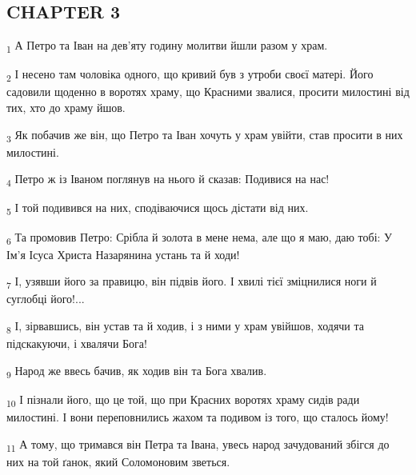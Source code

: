\subsection{CHAPTER 3}
\begin{tcolorbox}
\textsubscript{1} А Петро та Іван на дев'яту годину молитви йшли разом у храм.
\end{tcolorbox}
\begin{tcolorbox}
\textsubscript{2} І несено там чоловіка одного, що кривий був з утроби своєї матері. Його садовили щоденно в воротях храму, що Красними звалися, просити милостині від тих, хто до храму йшов.
\end{tcolorbox}
\begin{tcolorbox}
\textsubscript{3} Як побачив же він, що Петро та Іван хочуть у храм увійти, став просити в них милостині.
\end{tcolorbox}
\begin{tcolorbox}
\textsubscript{4} Петро ж із Іваном поглянув на нього й сказав: Подивися на нас!
\end{tcolorbox}
\begin{tcolorbox}
\textsubscript{5} І той подивився на них, сподіваючися щось дістати від них.
\end{tcolorbox}
\begin{tcolorbox}
\textsubscript{6} Та промовив Петро: Срібла й золота в мене нема, але що я маю, даю тобі: У Ім'я Ісуса Христа Назарянина устань та й ходи!
\end{tcolorbox}
\begin{tcolorbox}
\textsubscript{7} І, узявши його за правицю, він підвів його. І хвилі тієї зміцнилися ноги й суглобці його!...
\end{tcolorbox}
\begin{tcolorbox}
\textsubscript{8} І, зірвавшись, він устав та й ходив, і з ними у храм увійшов, ходячи та підскакуючи, і хвалячи Бога!
\end{tcolorbox}
\begin{tcolorbox}
\textsubscript{9} Народ же ввесь бачив, як ходив він та Бога хвалив.
\end{tcolorbox}
\begin{tcolorbox}
\textsubscript{10} І пізнали його, що це той, що при Красних воротях храму сидів ради милостині. І вони переповнились жахом та подивом із того, що сталось йому!
\end{tcolorbox}
\begin{tcolorbox}
\textsubscript{11} А тому, що тримався він Петра та Івана, увесь народ зачудований збігся до них на той ґанок, який Соломоновим зветься.
\end{tcolorbox}
